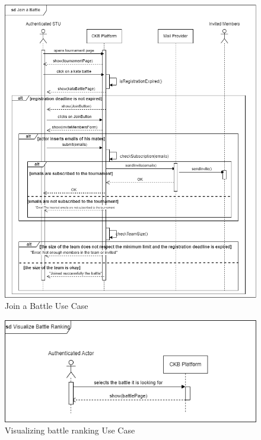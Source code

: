     \begin{figure}[H]
        \centering
        \includegraphics[width=1\textwidth]{images/sequence_diagrams/ClassDiagram-UC7-SequenceDiagram.png}
        \caption{Join a Battle Use Case}
        \label{fig:uc7}
    \end{figure}
    \begin{figure}[H]
        \centering
        \includegraphics[width=1\textwidth]{images/sequence_diagrams/ClassDiagram-UC12-SequenceDiagram.png}
        \caption{Visualizing battle ranking Use Case}
        \label{fig:uc12}
    \end{figure}
